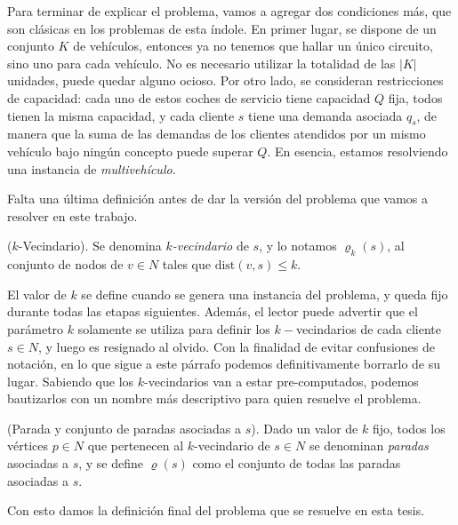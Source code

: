 Para terminar de explicar el problema, vamos a agregar dos condiciones más, que son clásicas en los problemas de esta índole. En primer lugar, se dispone de un conjunto $K$ de vehículos, entonces ya no tenemos que hallar un único circuito, sino uno para cada vehículo. No es necesario utilizar la totalidad de las $|K|$ unidades, puede quedar alguno ocioso. Por otro lado, se consideran restricciones de capacidad: cada uno de estos coches de servicio tiene capacidad $Q$ fija, todos tienen la misma capacidad, y cada cliente $s$ tiene una demanda asociada $q_s$, de manera que la suma de las demandas de los clientes atendidos por un mismo vehículo bajo ningún concepto puede superar $Q$. En esencia, estamos resolviendo una instancia de  \emph{multivehículo}.

Falta una última definición antes de dar la versión del problema que vamos a resolver en este trabajo. 

\begin{definition}
    ($k$-Vecindario).
    Se denomina \emph{$k$-vecindario} de $s$, y lo notamos $\varrho_k(s)$, al conjunto de nodos de $v \in N$ tales que $\text{dist}(v, s) \leq k$.
\end{definition}

El valor de $k$ se define cuando se genera una instancia del problema, y queda fijo durante todas las etapas siguientes. Además, el lector puede advertir que el parámetro $k$ solamente se utiliza para definir los $k-$vecindarios de cada cliente $s \in N$, y luego es resignado al olvido. Con la finalidad de evitar confusiones de notación, en lo que sigue a este párrafo podemos definitivamente borrarlo de su lugar. Sabiendo que los $k$-vecindarios van a estar pre-computados, podemos bautizarlos con un nombre más descriptivo para quien resuelve el problema. 

\begin{definition}
    (Parada y conjunto de paradas asociadas a $s$).
    Dado un valor de $k$ fijo, todos los vértices $p \in N$ que pertenecen al $k$-vecindario de $s \in N$ se denominan \emph{paradas} asociadas a $s$, y se define $\varrho(s)$ como el conjunto de todas las paradas asociadas a $s$. 
\end{definition}

Con esto damos la definición final del problema que se resuelve en esta tesis.

\label{star-vrp}

